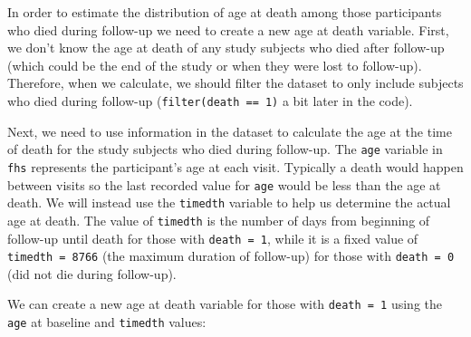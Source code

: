 \documentclass[
]{book}
\newenvironment{Shaded}{\begin{snugshade}}{\end{snugshade}}
\newcommand{\CommentTok}[1]{\textcolor[rgb]{0.56,0.35,0.01}{\textit{#1}}}
\newcommand{\DataTypeTok}[1]{\textcolor[rgb]{0.13,0.29,0.53}{#1}}
\newcommand{\FloatTok}[1]{\textcolor[rgb]{0.00,0.00,0.81}{#1}}
\newcommand{\KeywordTok}[1]{\textcolor[rgb]{0.13,0.29,0.53}{\textbf{#1}}}
\newcommand{\NormalTok}[1]{#1}
\newcommand{\OperatorTok}[1]{\textcolor[rgb]{0.81,0.36,0.00}{\textbf{#1}}}
\newcommand{\StringTok}[1]{\textcolor[rgb]{0.31,0.60,0.02}{#1}}
\begin{document}
In order to estimate the distribution of age at death among those participants who died during follow-up we need to create a new age at death variable. First, we don't know the age at death of any study subjects who died after follow-up (which could be the end of the study or when they were lost to follow-up). Therefore, when we calculate, we should filter the dataset to only include subjects who died during follow-up (\texttt{filter(death\ ==\ 1)} a bit later in the code).

Next, we need to use information in the dataset to calculate the age at the time of death for the study subjects who died during follow-up.
The \texttt{age} variable in \texttt{fhs} represents the participant's age at each visit. Typically a death would happen between visits so the last recorded value for \texttt{age} would be less than the age at death. We will instead use the \texttt{timedth} variable to help us determine the actual age at death. The value of \texttt{timedth} is the number of days from beginning of follow-up until death for those with \texttt{death\ =\ 1}, while it is a fixed value of \texttt{timedth\ =\ 8766} (the maximum duration of follow-up) for those with \texttt{death\ =\ 0} (did not die during follow-up).

We can create a new age at death variable for those with \texttt{death\ =\ 1} using the \texttt{age} at baseline and \texttt{timedth} values:

\begin{Shaded}
\end{Shaded}
\end{document}
